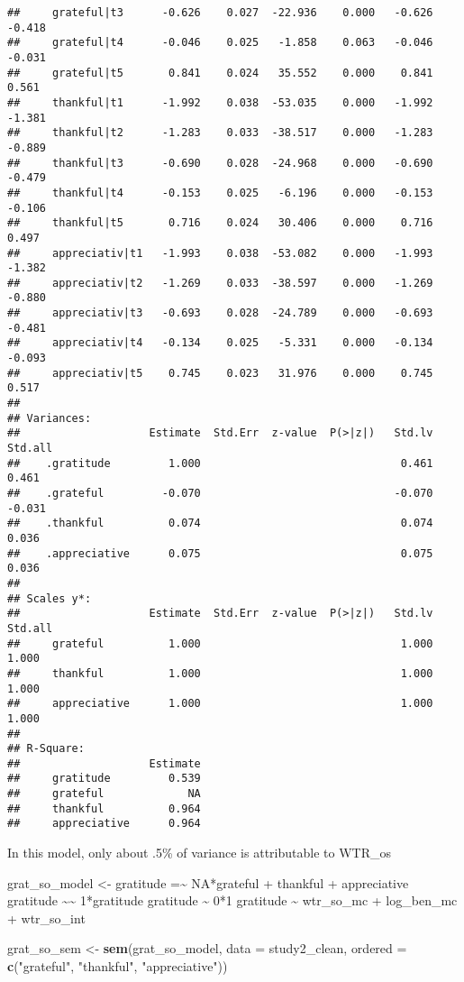 \documentclass[
]{article}
\newenvironment{Shaded}{\begin{snugshade}}{\end{snugshade}}
\newcommand{\AttributeTok}[1]{\textcolor[rgb]{0.13,0.29,0.53}{#1}}
\newcommand{\FunctionTok}[1]{\textcolor[rgb]{0.13,0.29,0.53}{\textbf{#1}}}
\newcommand{\NormalTok}[1]{#1}
\newcommand{\OtherTok}[1]{\textcolor[rgb]{0.56,0.35,0.01}{#1}}
\newcommand{\StringTok}[1]{\textcolor[rgb]{0.31,0.60,0.02}{#1}}
\begin{document}
\begin{verbatim}
##     grateful|t3      -0.626    0.027  -22.936    0.000   -0.626   -0.418
##     grateful|t4      -0.046    0.025   -1.858    0.063   -0.046   -0.031
##     grateful|t5       0.841    0.024   35.552    0.000    0.841    0.561
##     thankful|t1      -1.992    0.038  -53.035    0.000   -1.992   -1.381
##     thankful|t2      -1.283    0.033  -38.517    0.000   -1.283   -0.889
##     thankful|t3      -0.690    0.028  -24.968    0.000   -0.690   -0.479
##     thankful|t4      -0.153    0.025   -6.196    0.000   -0.153   -0.106
##     thankful|t5       0.716    0.024   30.406    0.000    0.716    0.497
##     appreciativ|t1   -1.993    0.038  -53.082    0.000   -1.993   -1.382
##     appreciativ|t2   -1.269    0.033  -38.597    0.000   -1.269   -0.880
##     appreciativ|t3   -0.693    0.028  -24.789    0.000   -0.693   -0.481
##     appreciativ|t4   -0.134    0.025   -5.331    0.000   -0.134   -0.093
##     appreciativ|t5    0.745    0.023   31.976    0.000    0.745    0.517
## 
## Variances:
##                    Estimate  Std.Err  z-value  P(>|z|)   Std.lv  Std.all
##    .gratitude         1.000                               0.461    0.461
##    .grateful         -0.070                              -0.070   -0.031
##    .thankful          0.074                               0.074    0.036
##    .appreciative      0.075                               0.075    0.036
## 
## Scales y*:
##                    Estimate  Std.Err  z-value  P(>|z|)   Std.lv  Std.all
##     grateful          1.000                               1.000    1.000
##     thankful          1.000                               1.000    1.000
##     appreciative      1.000                               1.000    1.000
## 
## R-Square:
##                    Estimate
##     gratitude         0.539
##     grateful             NA
##     thankful          0.964
##     appreciative      0.964
\end{verbatim}

In this model, only about .5\% of variance is attributable to WTR\_os

\begin{Shaded}
\begin{Highlighting}[]
\NormalTok{grat\_so\_model }\OtherTok{\textless{}{-}} \StringTok{\textquotesingle{}}
\StringTok{  gratitude =\textasciitilde{} NA*grateful + thankful + appreciative}
\StringTok{  gratitude \textasciitilde{}\textasciitilde{} 1*gratitude}
\StringTok{  gratitude \textasciitilde{} 0*1}
\StringTok{  }
\StringTok{  gratitude \textasciitilde{} wtr\_so\_mc + log\_ben\_mc + wtr\_so\_int}
\StringTok{\textquotesingle{}}

\NormalTok{grat\_so\_sem }\OtherTok{\textless{}{-}} \FunctionTok{sem}\NormalTok{(grat\_so\_model, }\AttributeTok{data =}\NormalTok{ study2\_clean, }\AttributeTok{ordered =} \FunctionTok{c}\NormalTok{(}\StringTok{"grateful"}\NormalTok{, }\StringTok{"thankful"}\NormalTok{, }\StringTok{"appreciative"}\NormalTok{))}
\end{Highlighting}
\end{Shaded}
\end{document}
